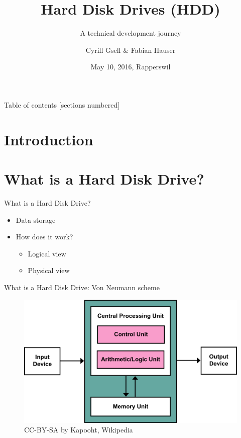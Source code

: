\documentclass[12pt]{beamer}
\title{Hard Disk Drives (HDD)}
\subtitle{A technical development journey}
\date{May 10, 2016, Rapperswil}
\author{Cyrill Gsell \& Fabian Hauser}
\institute{Computer Science \\
	TecBEC Presentation FS 2016}
\newlength{\wideitemsep}
\let\olditem\item
\renewcommand{\item}{\setlength{\itemsep}{\wideitemsep}\olditem}
\begin{document}
\maketitle

\begin{frame}{Table of contents}
  [sections numbered]
  \tableofcontents
\end{frame}

\section{Introduction}
\section{What is a Hard Disk Drive?}
\begin{frame}[fragile]{What is a Hard Disk Drive?}
	\begin{itemize}
		\item Data storage
		\item How does it work?
			\begin{itemize}
				\item Logical view
				\item Physical view
			\end{itemize}
	\end{itemize}
\end{frame}

\begin{frame}[fragile]{What is a Hard Disk Drive: Von Neumann scheme}
	\begin{figure}[p]
		\centering
		\includegraphics[width=\linewidth]{img/vonneumann.png}
		\caption{CC-BY-SA by Kapooht, Wikipedia}
	\end{figure}
\end{frame}
\end{document}

